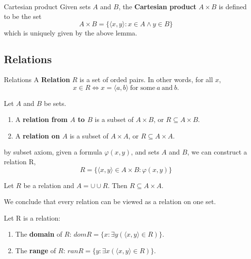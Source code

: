 \begin{definition}{Cartesian product}{}
    Given sets $A$ and $B$, the \textbf{Cartesian product} $A \times B$ is defined to be the set
    \begin{equation*}
        A \times B = \{\langle x,y \rangle : x \in A \land y \in B\}
    \end{equation*}
    which is uniquely given by the above lemma.
\end{definition}

\subsection{Relations}
\begin{definition}{Relations}{}
    A \textbf{Relation} $R$ is a set of orded pairs. In other words, for all $x$,
    \begin{equation*}
        x \in R \iff x = \langle a,b \rangle \ \text{for some}\ a\ \text{and}\ b.
    \end{equation*}
\end{definition}

\begin{definition}{}{}
    Let $A$ and $B$ be sets. 
    \begin{enumerate}

        \item A \textbf{relation from $A$ to $B$} is a subset of $A \times B$, or $R \subseteq A \times B$. 
        \item A \textbf{relation on $A$} is a subset of $A \times A$, or $R \subseteq A \times A$. 
    \end{enumerate}
\end{definition}

\begin{remarks}
    by subset axiom, given a formula $\varphi(x,y)$, and sets $A$ and $B$, we can construct a relation R,
    \begin{equation*}
        R = \{\langle x,y \rangle \in A \times B : \varphi(x,y)\}
    \end{equation*}
\end{remarks}

\begin{lemma}{}{}
    Let $R$ be a relation and $A = \cup \cup R$. Then $R \subseteq A \times A$.
\end{lemma}

We conclude that every relation can be viewed as a relation on one set.

\begin{definition}{}{}
    Let R is a relation:
    \begin{enumerate}

        \item The \textbf{domain} of $R$: $dom{R} = \{x : \exists y (\langle x,y \rangle \in R)\}$.
        \item The \textbf{range} of $R$: $ran{R} = \{y : \exists x (\langle x,y \rangle \in R)\}$.

    \end{enumerate}
\end{definition}

